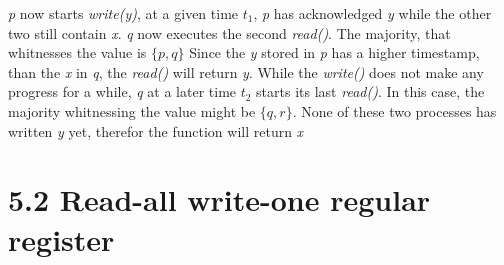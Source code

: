\documentclass{article}
\begin{document}
\begin{enumerate}[a)]
        \textit{p} now starts \textit{write(y)}, at a given time $\textit{t}_1$, \textit{p} has acknowledged \textit{y} while the other two still contain \textit{x}.
        \textit{q} now executes the second \textit{read()}. The majority, that whitnesses the value is $\{ p, q \}$
        Since the \textit{y} stored in \textit{p} has a higher timestamp, than the \textit{x} in \textit{q}, the \textit{read()} will return \textit{y}.
        While the \textit{write()} does not make any progress for a while, \textit{q} at a later time $\textit{t}_2$ starts its last \textit{read()}.
        In this case, the majority whitnessing the value might be $\{q, r\}$.
        None of these two processes has written \textit{y} yet, therefor the function will return \textit{x}
    \end{enumerate}
    \section*{5.2 Read-all write-one regular register}
\end{document}
